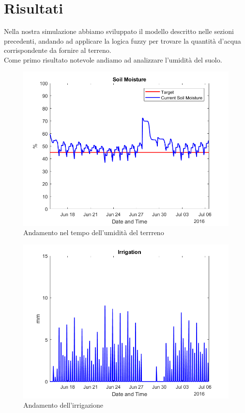 \documentclass[conference,10pt]{IEEEtran}
\begin{document}
\section{Risultati}\label{sec:res}
Nella nostra simulazione abbiamo sviluppato il modello descritto nelle sezioni precedenti, andando ad applicare la logica fuzzy per trovare la quantità d'acqua corrispondente da fornire al terreno.\\
Come primo risultato notevole andiamo ad analizzare l'umidità del suolo. 
\begin{figure}[ht]
	\centering
	\includegraphics[width=0.9\linewidth]{images/soil_moisture.png}
	\caption{Andamento nel tempo dell'umidità del terrreno}
	\label{fig:MAD}
\end{figure}
\vspace*{-0.5 cm}
\begin{figure}[ht]
	\centering
	\includegraphics[width=0.9\linewidth]{images/irrigation.png}
	\caption{Andamento dell'irrigazione}
	\label{fig:MAD}
\end{figure}
\end{document}
